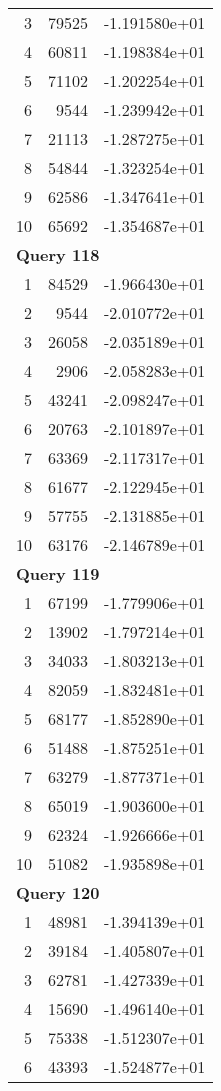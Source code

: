 \begin{longtable}[{p}]{@{}rrp{}@{}}
3 & 79525 & -1.191580e+01 \\
4 & 60811 & -1.198384e+01 \\
5 & 71102 & -1.202254e+01 \\
6 & 9544 & -1.239942e+01 \\
7 & 21113 & -1.287275e+01 \\
8 & 54844 & -1.323254e+01 \\
9 & 62586 & -1.347641e+01 \\
10 & 65692 & -1.354687e+01 \\
\midrule
\multicolumn{3}{l}{\bfseries Query 118} \\
1 & 84529 & -1.966430e+01 \\
2 & 9544 & -2.010772e+01 \\
3 & 26058 & -2.035189e+01 \\
4 & 2906 & -2.058283e+01 \\
5 & 43241 & -2.098247e+01 \\
6 & 20763 & -2.101897e+01 \\
7 & 63369 & -2.117317e+01 \\
8 & 61677 & -2.122945e+01 \\
9 & 57755 & -2.131885e+01 \\
10 & 63176 & -2.146789e+01 \\
\midrule
\multicolumn{3}{l}{\bfseries Query 119} \\
1 & 67199 & -1.779906e+01 \\
2 & 13902 & -1.797214e+01 \\
3 & 34033 & -1.803213e+01 \\
4 & 82059 & -1.832481e+01 \\
5 & 68177 & -1.852890e+01 \\
6 & 51488 & -1.875251e+01 \\
7 & 63279 & -1.877371e+01 \\
8 & 65019 & -1.903600e+01 \\
9 & 62324 & -1.926666e+01 \\
10 & 51082 & -1.935898e+01 \\
\midrule
\multicolumn{3}{l}{\bfseries Query 120} \\
1 & 48981 & -1.394139e+01 \\
2 & 39184 & -1.405807e+01 \\
3 & 62781 & -1.427339e+01 \\
4 & 15690 & -1.496140e+01 \\
5 & 75338 & -1.512307e+01 \\
6 & 43393 & -1.524877e+01 \\

\end{longtable}
